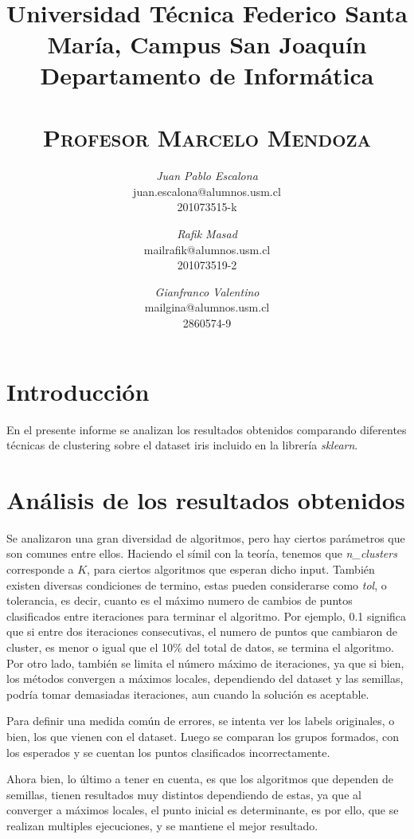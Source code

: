 \documentclass{article}
\title{
  \Large\textmd{\textbf{\tareaRamo\\ \tareaTitulo}}\\
  \vspace{0.1in}
  \normalsize
  Universidad Técnica Federico Santa María, Campus San Joaquín\\
  Departamento de Informática\\
  \vspace{0.1in}
  \small{\textsc{\tareaFecha}}\\
  \vspace{0.1in}
  \large{\textsc{Profesor Marcelo Mendoza}}
  \vspace{1.5in}
}
\author{
    \textit{Juan Pablo Escalona} \\
    \small{juan.escalona@alumnos.usm.cl} \\
    \small{201073515-k}
    \and
    \textit{Rafik Masad} \\
    \small{mailrafik@alumnos.usm.cl} \\
    \small{201073519-2}
    \and
    \textit{Gianfranco Valentino}\\
    \small{mailgina@alumnos.usm.cl}\\
    \small{2860574-9}
}
\date{}
\begin{document}
\maketitle
\newpage


\section*{Introducción}

En el presente informe se analizan los resultados obtenidos comparando diferentes técnicas de clustering sobre el dataset iris incluido en la librería \textit{sklearn}. 

\section*{Análisis de los resultados obtenidos}
Se analizaron una gran diversidad de algoritmos, pero hay ciertos parámetros que son comunes entre ellos. Haciendo el símil con la teoría, tenemos que \emph{n\_clusters} corresponde a $K$, para ciertos
algoritmos que esperan dicho input. También existen diversas condiciones de termino, estas pueden considerarse como \emph{tol}, o tolerancia, es decir, cuanto es el máximo numero de cambios de puntos clasificados entre iteraciones
para terminar el algoritmo. Por ejemplo, 0.1 significa que si entre dos iteraciones consecutivas, el numero de puntos que cambiaron de cluster, es menor o igual que el 10\% del total de datos, se termina el algoritmo. Por otro lado, también 
se limita el número máximo de iteraciones, ya que si bien, los métodos convergen a máximos locales, dependiendo del dataset y las semillas, podría tomar demasiadas iteraciones, aun cuando la solución es aceptable.

Para definir una medida común de errores, se intenta ver los labels originales, o bien, los que vienen con el dataset. Luego se comparan los grupos formados, con los esperados y se cuentan los puntos clasificados incorrectamente.

Ahora bien, lo último a tener en cuenta, es que los algoritmos que dependen de semillas, tienen resultados muy distintos dependiendo de estas, ya que al converger a máximos locales, el punto inicial es determinante, es por ello, que se realizan
multiples ejecuciones, y se mantiene el mejor resultado.
\end{document}
